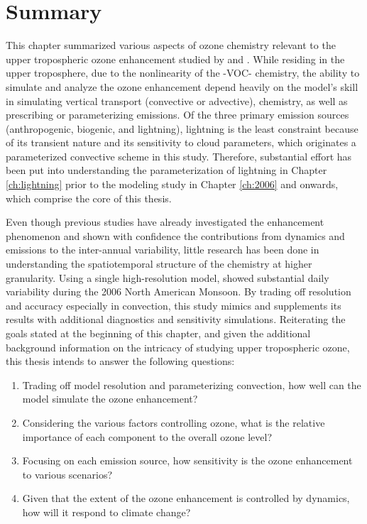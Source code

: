 \section{Summary} \label{sect:intro/summary}

This chapter summarized various aspects of ozone chemistry relevant to the upper tropospheric ozone
enhancement studied by \citet{Li:2005ss} and \citet{Cooper:2009nx}. While residing in the upper
troposphere, due to the nonlinearity of the -VOC- chemistry, the ability to
simulate and analyze the ozone enhancement depend heavily on the model's skill in simulating
vertical transport (convective or advective), chemistry, as well as prescribing or parameterizing emissions.
Of the three primary emission sources (anthropogenic, biogenic, and lightning), lightning 
is the least constraint because of its transient nature and its sensitivity to cloud parameters, which originates
a parameterized convective scheme in this study. Therefore, substantial effort has been put into understanding
the parameterization of lightning in Chapter \ref{ch:lightning} prior to the modeling study in Chapter
\ref{ch:2006} and onwards, which comprise the core of this thesis.

Even though previous studies have already investigated the enhancement phenomenon and shown
with confidence the contributions from dynamics and emissions to the inter-annual variability, little
research has been done in understanding the spatiotemporal structure of the chemistry at higher granularity.
Using a single high-resolution model, \citet{Barth:2012qf} showed substantial daily variability during the
2006 North American Monsoon. By trading off resolution and accuracy especially in convection, this
study mimics \citet{Barth:2012qf} and supplements its results with additional diagnostics and sensitivity
simulations. Reiterating the goals stated at the beginning of this chapter, and given the additional
background information on the intricacy of studying upper tropospheric ozone, this thesis intends to
answer the following questions:
\begin{enumerate}
\item{} Trading off model resolution and parameterizing convection, how well can the model simulate the ozone enhancement?
\item{} Considering the various factors controlling ozone, what is the relative importance of each component to the overall ozone level?
\item{} Focusing on each emission source, how sensitivity is the ozone enhancement to various scenarios?
\item{} Given that the extent of the ozone enhancement is controlled by dynamics, how will it respond to climate change?
\end{enumerate}